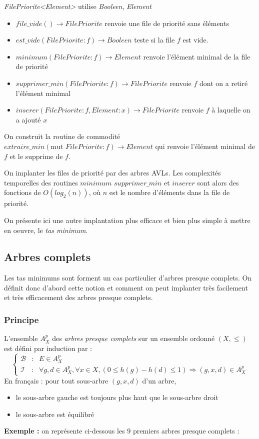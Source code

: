 \documentclass[../../../main.tex]{subfiles}
\begin{document}
\textit{FilePriorite\textless{}Element\textgreater} utilise \textit{Booleen}, \textit{Element}
\begin{itemize}
	\item $file\_vide()\rightarrow FilePriorite$ renvoie une file de priorité sans éléments
	\item $est\_vide(FilePriorite:f)\rightarrow Booleen$ teste si la file $f$ est vide.
	\item $minimum(FilePriorite:f)\rightarrow Element$ renvoie l'élément minimal de la file de priorité
	\item $supprimer\_min(FilePriorite:f)\rightarrow FilePriorite$ renvoie $f$ dont on a retiré l'élément minimal
	\item $inserer(FilePriorite:f, Element:x)\rightarrow FilePriorite$ renvoie $f$ à laquelle on a ajouté $x$
\end{itemize}
On construit la routine de commodité $extraire\_min(\text{mut }FilePriorite:f)\rightarrow Element$ qui renvoie l'élément minimal de $f$ et le supprime de $f$.

On implanter les files de priorité par des arbres AVLs. Les complexités temporelles des routines $minimum$ $supprimer\_min$ et $inserer$ sont alors des fonctions de $O(log_2(n))$, où $n$ est le nombre d'éléments dans la file de priorité.

On présente ici une autre implantation plus efficace et bien plus simple à mettre en oeuvre, le \textit{tas minimum}.
\subsection{Arbres complets}
Les tas minimums sont forment un cas particulier d'arbres presque complets. On définit donc d'abord cette notion et comment on peut implanter très facilement et très efficacement des arbres presque complets.
\subsubsection{Principe}
 {
	L'ensemble $A^p_X$ des \textit{arbres presque complets} sur un ensemble ordonné $(X, \leq)$ est défini par induction par :
	$$\left\{\begin{array}{cll}
	\mathcal{B} & : & E\in A^p_X \\
	\mathcal{I} & : & \forall g, d\in A^p_X, \forall x\in X, (0 \leq h(g) - h(d) \leq 1) \Rightarrow (g, x, d)\in A^p_X
\end{array}\right.$$
	En français : pour tout sous-arbre $(g, x, d)$ d'un arbre,
	\begin{itemize}
		\item le sous-arbre gauche est toujours plus haut que le sous-arbre droit
		\item le sous-arbre est équilibré
	\end{itemize}
}
\textbf{Exemple :} on représente ci-dessous les 9 premiers arbres presque complets :
\end{document}
